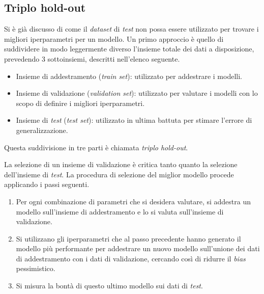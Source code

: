 \subsection{Triplo hold-out}
Si è già discusso di come il \emph{dataset} di \emph{test} non possa essere utilizzato per trovare i migliori iperparametri per un modello.
Un primo approccio è quello di suddividere in modo leggermente diverso l'insieme totale dei dati a disposizione, prevedendo 3 sottoinsiemi, descritti nell'elenco seguente.
\begin{itemize}
    \item Insieme di addestramento (\emph{train set}): utilizzato per addestrare i modelli.
    \item Insieme di validazione (\emph{validation set}): utilizzato per valutare i modelli con lo scopo di definire i migliori iperparametri.
    \item Insieme di \emph{test} (\emph{test set}): utilizzato in ultima battuta per stimare l'errore di generalizzazione.
\end{itemize}
Questa suddivisione in tre parti è chiamata \emph{triplo hold-out}.

La selezione di un insieme di validazione è critica tanto quanto la selezione dell'insieme di \emph{test}.
La procedura di selezione del miglior modello procede applicando i passi seguenti.
\begin{enumerate}
    \item Per ogni combinazione di parametri che si desidera valutare, si addestra un modello sull'insieme di addestramento e lo si valuta sull'insieme di validazione.
    \item Si utilizzano gli iperparametri che al passo precedente hanno generato il modello più performante per addestrare un nuovo modello sull'unione dei dati di addestramento con i dati di validazione, cercando così di ridurre il \emph{bias} pessimistico.
    \item Si misura la bontà di questo ultimo modello sui dati di \emph{test}.
\end{enumerate}

